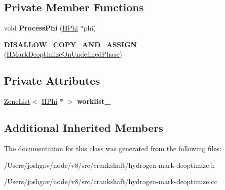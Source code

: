 \subsection*{Private Member Functions}
\begin{DoxyCompactItemize}
\item 
void {\bfseries Process\+Phi} (\hyperlink{classv8_1_1internal_1_1_h_phi}{H\+Phi} $\ast$phi)\hypertarget{classv8_1_1internal_1_1_h_mark_deoptimize_on_undefined_phase_a3bcb924895da2529575b4781a337f3ba}{}\label{classv8_1_1internal_1_1_h_mark_deoptimize_on_undefined_phase_a3bcb924895da2529575b4781a337f3ba}

\item 
{\bfseries D\+I\+S\+A\+L\+L\+O\+W\+\_\+\+C\+O\+P\+Y\+\_\+\+A\+N\+D\+\_\+\+A\+S\+S\+I\+GN} (\hyperlink{classv8_1_1internal_1_1_h_mark_deoptimize_on_undefined_phase}{H\+Mark\+Deoptimize\+On\+Undefined\+Phase})\hypertarget{classv8_1_1internal_1_1_h_mark_deoptimize_on_undefined_phase_a4bd77c85ccbe9cb7b2114c8decf09dc0}{}\label{classv8_1_1internal_1_1_h_mark_deoptimize_on_undefined_phase_a4bd77c85ccbe9cb7b2114c8decf09dc0}

\end{DoxyCompactItemize}
\subsection*{Private Attributes}
\begin{DoxyCompactItemize}
\item 
\hyperlink{classv8_1_1internal_1_1_zone_list}{Zone\+List}$<$ \hyperlink{classv8_1_1internal_1_1_h_phi}{H\+Phi} $\ast$ $>$ {\bfseries worklist\+\_\+}\hypertarget{classv8_1_1internal_1_1_h_mark_deoptimize_on_undefined_phase_a373c6dafcb805186502c1c93252c7dac}{}\label{classv8_1_1internal_1_1_h_mark_deoptimize_on_undefined_phase_a373c6dafcb805186502c1c93252c7dac}

\end{DoxyCompactItemize}
\subsection*{Additional Inherited Members}


The documentation for this class was generated from the following files\+:\begin{DoxyCompactItemize}
\item 
/\+Users/joshgav/node/v8/src/crankshaft/hydrogen-\/mark-\/deoptimize.\+h\item 
/\+Users/joshgav/node/v8/src/crankshaft/hydrogen-\/mark-\/deoptimize.\+cc\end{DoxyCompactItemize}
